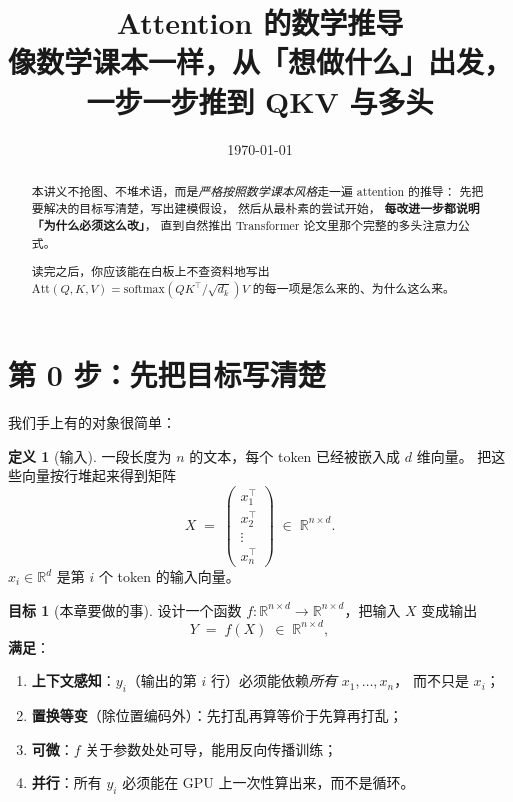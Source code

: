 \documentclass[11pt,a4paper]{ctexart}
\title{Attention 的数学推导\\\large 像数学课本一样，从「想做什么」出发，一步一步推到 QKV 与多头}
\author{}
\date{\today}
\theoremstyle{definition}
\newtheorem{goalbox}{目标}
\newtheorem{definitionx}{定义}
\theoremstyle{remark}
\newcommand{\R}{\mathbb{R}}
\newcommand{\softmax}{\mathrm{softmax}}
\newcommand{\Att}{\mathrm{Att}}
\begin{document}
\maketitle

\begin{abstract}
本讲义不抢图、不堆术语，而是\emph{严格按照数学课本风格}走一遍 attention 的推导：
先把要解决的目标写清楚，写出建模假设，
然后从最朴素的尝试开始，
\textbf{每改进一步都说明「为什么必须这么改」}，
直到自然推出 Transformer 论文里那个完整的多头注意力公式。

读完之后，你应该能在白板上不查资料地写出
$\Att(Q,K,V) = \softmax(QK^\top / \sqrt{d_k})V$
的每一项是怎么来的、为什么这么来。
\end{abstract}

\tableofcontents
\newpage

\section{第 0 步：先把目标写清楚}

我们手上有的对象很简单：

\begin{definitionx}[输入]
一段长度为 $n$ 的文本，每个 token 已经被嵌入成 $d$ 维向量。
把这些向量按行堆起来得到矩阵
\[
  X \;=\; \begin{pmatrix} x_1^\top \\ x_2^\top \\ \vdots \\ x_n^\top \end{pmatrix}
  \;\in\; \R^{n \times d}.
\]
$x_i \in \R^d$ 是第 $i$ 个 token 的输入向量。
\end{definitionx}

\begin{goalbox}[本章要做的事]
设计一个函数 $f: \R^{n \times d} \to \R^{n \times d}$，把输入 $X$ 变成输出
\[
  Y \;=\; f(X) \;\in\; \R^{n \times d},
\]
\textbf{满足}：
\begin{enumerate}
  \item \textbf{上下文感知}：$y_i$（输出的第 $i$ 行）必须能依赖\emph{所有} $x_1, \dots, x_n$，
        而不只是 $x_i$；
  \item \textbf{置换等变}（除位置编码外）：先打乱再算等价于先算再打乱；
  \item \textbf{可微}：$f$ 关于参数处处可导，能用反向传播训练；
  \item \textbf{并行}：所有 $y_i$ 必须能在 GPU 上一次性算出来，而不是循环。
\end{enumerate}
\end{goalbox}
\end{document}

